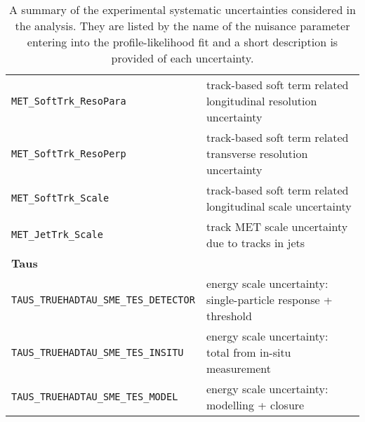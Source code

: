 \begin{table}
{\begin{tabular}{ll}
      \texttt{MET\_SoftTrk\_ResoPara} & track-based soft term related longitudinal resolution uncertainty \\
      \texttt{MET\_SoftTrk\_ResoPerp} &  track-based soft term related transverse resolution uncertainty \\
      \texttt{MET\_SoftTrk\_Scale} & track-based soft term related longitudinal scale uncertainty \\
      \texttt{MET\_JetTrk\_Scale} & track MET scale uncertainty due to tracks in jets \\
      {\bfseries Taus}&\\
      \texttt{TAUS\_TRUEHADTAU\_SME\_TES\_DETECTOR} & energy scale uncertainty: single-particle response + threshold \\
      \texttt{TAUS\_TRUEHADTAU\_SME\_TES\_INSITU} & energy scale uncertainty: total from in-situ measurement \\
      \texttt{TAUS\_TRUEHADTAU\_SME\_TES\_MODEL} & energy scale uncertainty: modelling + closure \\
      \bottomrule
    \end{tabular}
  }
  \caption[A summary of experimental systematic uncertainties.]{A summary of the
    experimental systematic uncertainties considered in the analysis. They are
    listed by the name of the nuisance parameter entering into the
    profile-likelihood fit and a short description is provided of each
    uncertainty.}
  \label{tab:expSyst}
\end{table}